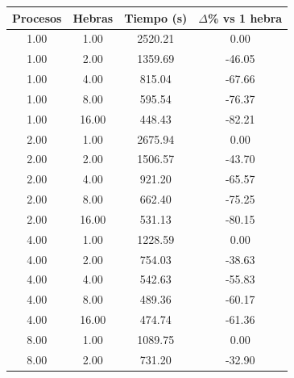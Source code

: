 \begin{table}[ht]
    \centering
    \begin{tabular}{|c|c|c|c|}
        \hline
        \textbf{Procesos} & \textbf{Hebras} & \textbf{Tiempo (s)} & \textbf{$\Delta$\% vs 1 hebra} \\
        \hline
        1.00              & 1.00            & 2520.21             & 0.00                           \\
        1.00              & 2.00            & 1359.69             & -46.05                         \\
        1.00              & 4.00            & 815.04              & -67.66                         \\
        1.00              & 8.00            & 595.54              & -76.37                         \\
        1.00              & 16.00           & 448.43              & -82.21                         \\
        2.00              & 1.00            & 2675.94             & 0.00                           \\
        2.00              & 2.00            & 1506.57             & -43.70                         \\
        2.00              & 4.00            & 921.20              & -65.57                         \\
        2.00              & 8.00            & 662.40              & -75.25                         \\
        2.00              & 16.00           & 531.13              & -80.15                         \\
        4.00              & 1.00            & 1228.59             & 0.00                           \\
        4.00              & 2.00            & 754.03              & -38.63                         \\
        4.00              & 4.00            & 542.63              & -55.83                         \\
        4.00              & 8.00            & 489.36              & -60.17                         \\
        4.00              & 16.00           & 474.74              & -61.36                         \\
        8.00              & 1.00            & 1089.75             & 0.00                           \\
        8.00              & 2.00            & 731.20              & -32.90                         \\

\end{tabular}
\end{table}
